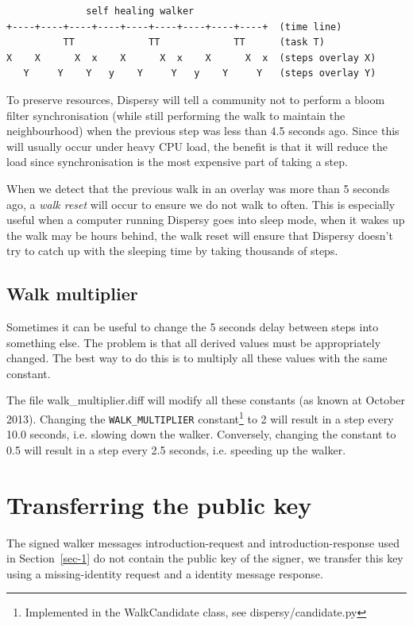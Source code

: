 \begin{verbatim}
              self healing walker
+----+----+----+----+----+----+----+----+----+  (time line)
          TT             TT             TT      (task T)
X    X      X  x    X      X  x    X      X  x  (steps overlay X)
   Y     Y    Y   y    Y     Y   y    Y     Y   (steps overlay Y)
\end{verbatim}

To preserve resources, Dispersy will tell a community not to perform a
bloom filter synchronisation (while still performing the walk to
maintain the neighbourhood) when the previous step was less than 4.5
seconds ago.  Since this will usually occur under heavy CPU load, the
benefit is that it will reduce the load since synchronisation is the
most expensive part of taking a step.

When we detect that the previous walk in an overlay was more than 5
seconds ago, a \emph{walk reset} will occur to ensure we do not walk to
often.  This is especially useful when a computer running Dispersy
goes into sleep mode, when it wakes up the walk may be hours behind,
the walk reset will ensure that Dispersy doesn’t try to catch up with
the sleeping time by taking thousands of steps.
\subsection{Walk multiplier}
\label{sec-7-3}
Sometimes it can be useful to change the 5 seconds delay between steps
into something else.  The problem is that all derived values must be
appropriately changed.  The best way to do this is to multiply all
these values with the same constant.

The file walk\_multiplier.diff will modify all these constants (as
known at October 2013).  Changing the \texttt{WALK\_MULTIPLIER}
constant\footnote{Implemented in the WalkCandidate class, see dispersy/candidate.py} to 2 will result in a step every 10.0 seconds,
i.e. slowing down the walker.  Conversely, changing the constant to
0.5 will result in a step every 2.5 seconds, i.e. speeding up the
walker.
\section{Transferring the public key}
\label{sec-8}
The signed walker messages introduction-request and
introduction-response used in Section~\ref{sec-1} do not contain the
public key of the signer, we transfer this key using a
missing-identity request and a identity message response.

